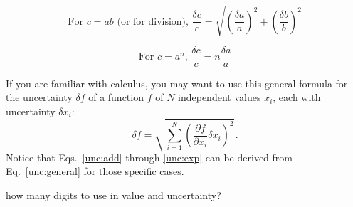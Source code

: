 \begin{equation}\label{unc:mult}
\textrm{For } c = ab \textrm{ (or for division), } \frac{\delta c}{c} = \sqrt{\left(\frac{\delta a}{a}\right)^2 + \left(\frac{\delta b}{b}\right)^2}
\end{equation}

\begin{equation}\label{unc:exp}
\textrm{For } c = a^n,\, \frac{\delta c}{c} = n \frac{\delta a}{a}
\end{equation}

If you are familiar with calculus, you may want to use this general formula for the uncertainty $\delta f$ of a function $f$ of $N$ independent values $x_i$, each with uncertainty $\delta x_i$:
\begin{equation}\label{unc:general}
\delta f = \sqrt{ \sum_{i=1}^{N} \left(\frac{\partial f}{\partial x_i} \delta x_i\right)^2 } \, .
\end{equation}
Notice that Eqs.\ \ref{unc:add} through \ref{unc:exp} can be derived from Eq.\ \ref{unc:general} for those specific cases.



how many digits to use in value and uncertainty?
